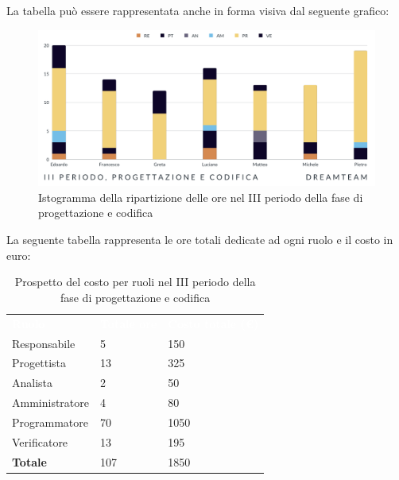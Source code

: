 La tabella può essere rappresentata anche in forma visiva dal seguente grafico:
\begin{figure}[!h]
\centering
\includegraphics[scale=0.65]{Sezioni/SezioniPreventivo/grafici/Progettazione_codifica_III_periodo.png}
\caption{Istogramma della ripartizione delle ore nel III periodo della fase di progettazione e codifica}
\end{figure}

La seguente tabella rappresenta le ore totali dedicate ad ogni ruolo e il costo in euro:

\begin{table}[!htbp]
\begin{center}
\renewcommand{\arraystretch}{1.5}
\begin{tabular}{ m{}<{\centering}  m{}<{\centering} m{}<{\centering}}
	\rowcolor{darkblue}
	\textcolor{white}{\textbf{Ruolo}}&\textcolor{white}{\textbf{Totale ore}}&\textcolor{white}{\textbf{Costo totale (\euro)}}\\ 

	Responsabile  & 5 & 150 \\	
	
	Progettista & 13 & 325 \\
	
	Analista & 2 & 50 \\

	Amministratore & 4 & 80 \\
	
	Programmatore & 70 & 1050 \\
	
	Verificatore & 13 & 195 \\
	
	\textbf{Totale} & 107 & 1850 \\
	
\end{tabular}
\caption{Prospetto del costo per ruoli nel III periodo della fase di progettazione e codifica}
\end{center}
\end{table}

